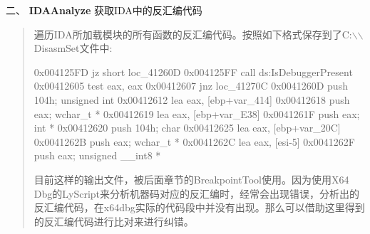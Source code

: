 \documentclass[AutoFakeBold,AutoFakeSlant]{article}
\begin{document}
	\newpage
	
	\begin{flushleft}
		\begin{LARGE}
			二、 \textbf{IDAAnalyze} 获取IDA中的反汇编代码
		\end{LARGE}
		
		\bigskip
		\bigskip
		
		\large 
		\linespread{1.6} \selectfont
		\begin{quote}
		遍历IDA所加载模块的所有函数的反汇编代码。按照如下格式保存到了C:$\backslash$$\backslash$DisasmSet文件中:
		\begin{x86asmcode}
	0x004125FD    jz      short loc_41260D
	0x004125FF    call    ds:IsDebuggerPresent
	0x00412605    test    eax, eax
	0x00412607    jnz     loc_41270C
	0x0041260D    push    104h; unsigned int
	0x00412612    lea     eax, [ebp+var_414]
	0x00412618    push    eax; wchar_t *
	0x00412619    lea     eax, [ebp+var_E38]
	0x0041261F    push    eax; int *
	0x00412620    push    104h; char
	0x00412625    lea     eax, [ebp+var_20C]
	0x0041262B    push    eax; wchar_t *
	0x0041262C    lea     eax, [esi-5]
	0x0041262F    push    eax; unsigned __int8 *
		\end{x86asmcode}
		
		目前这样的输出文件，被后面章节的BreakpointTool使用。因为使用X64 Dbg的LyScript来分析机器码对应的反汇编时，经常会出现错误，分析出的反汇编代码，在x64dbg实际的代码段中并没有出现。那么可以借助这里得到的反汇编代码进行比对来进行纠错。
		\end{quote}
	\end{flushleft}
	
	\newpage
	
\end{document}
